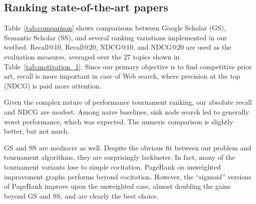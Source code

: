 \documentclass[runningheads]{llncs}
\begin{document}
\subsection{Ranking state-of-the-art papers}
\label{sec:rank_SOTA}

Table~\ref{tab:comparison} shows comparisons between Google Scholar (GS), Semantic Scholar (SS), and several ranking variations implemented in our testbed.  Recall@10, Recall@20, NDCG@10, and NDCG@20 are used as the evaluation measures, averaged over the 27 topics shown in Table~\ref{tab:motivation_1}. Since our primary objective is to find competitive prior art, recall is more important in case of Web search, where precision at the top (NDCG) is paid more attention.

Given the complex nature of performance tournament ranking, our absolute recall and NDCG are modest. Among naive baselines, sink node search led to generally worst performance, which was expected. The numeric comparison is slightly better, but not much.

GS and SS are mediocre as well. Despite the obvious fit between our problem and tournament algorithms, they are surprisingly lackluster.  In fact, many of the tournament variants lose to simple cocitation. PageRank on unweighted improvement graphs performs beyond cocitation. However, the ``sigmoid'' versions of PageRank improve upon the unweighted case, almost doubling the gains beyond GS and SS, and are clearly the best choice.
\end{document}
